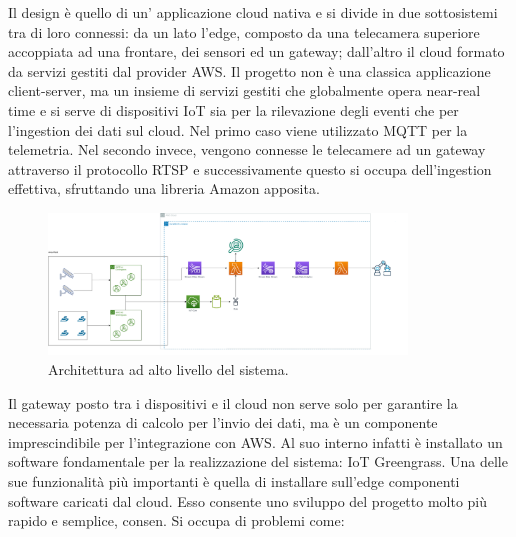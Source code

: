  Il design è quello di un’ applicazione cloud nativa e si divide in due sottosistemi tra di loro connessi: da un lato l'edge, composto da una telecamera superiore accoppiata ad una frontare, dei sensori ed un gateway; dall'altro il cloud formato da servizi gestiti dal provider AWS. Il progetto non è una classica applicazione client-server, ma un insieme di servizi gestiti che globalmente opera near-real time e si serve di dispositivi IoT sia per la rilevazione degli eventi che per l’ingestion dei dati sul cloud. Nel primo caso viene utilizzato MQTT per la telemetria. Nel secondo invece, vengono connesse le telecamere ad un gateway attraverso il protocollo RTSP e successivamente questo si occupa dell'ingestion effettiva, sfruttando una libreria Amazon apposita. 

\begin{figure}[htbp]
    \centering
    \includegraphics[width=0.85\textwidth]{figures/architettura.png}
    \caption{Architettura ad alto livello del sistema.} 
    \label{fig:architettura}
\end{figure}
 

Il gateway posto tra i dispositivi e il cloud non serve solo per garantire la necessaria potenza di calcolo per l’invio dei dati, ma è un componente imprescindibile per l’integrazione con AWS. Al suo interno infatti è installato un software fondamentale per la realizzazione del sistema: IoT Greengrass. Una delle sue funzionalità più importanti è quella di installare sull'edge componenti software caricati dal cloud. Esso consente uno sviluppo del progetto molto più rapido e semplice, consen. Si occupa di problemi come: 


